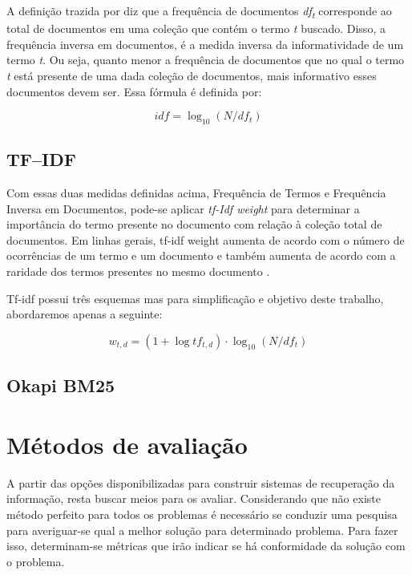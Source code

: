 A definição trazida por \cite{Manning2008} diz que a frequência de documentos \textit{df\textsubscript{t}} corresponde ao total de documentos em uma coleção que contém o termo \textit{t} buscado. Disso, a frequência inversa em documentos, é a medida inversa da informatividade de um termo \textit{t}. Ou seja, quanto menor a frequência de documentos que no qual o termo \textit{t} está presente de uma dada coleção de documentos, mais informativo esses documentos devem ser. Essa fórmula é definida por:

\begin{equation}
idf = \log_{10}(N/df_{t})
\label{eq:idf}
\end{equation}

\subsection{TF–IDF}

Com essas duas medidas definidas acima, Frequência de Termos e Frequência Inversa em Documentos, pode-se aplicar \textit{tf-Idf weight} para determinar a importância do termo presente no documento com relação à coleção total de documentos. Em linhas gerais, tf-idf weight aumenta de acordo com o número de ocorrências de um termo e um documento e também aumenta de acordo com a raridade dos termos presentes no mesmo documento \cite{Manning2008}. 

Tf-idf possui três esquemas mas para simplificação e objetivo deste trabalho, abordaremos apenas a seguinte:
 
\begin{equation}
w_{t,d} = (1 + \log tf_{t,d}) \cdot \log_{10}(N/df_{t})
\label{eq:tf-idf}
\end{equation}

\subsection{Okapi BM25}

\section{Métodos de avaliação}
A partir das opções disponibilizadas para construir sistemas de recuperação da informação, resta buscar meios para os avaliar. Considerando que não existe método perfeito para todos os problemas é necessário se conduzir uma pesquisa para averiguar-se qual a melhor solução para determinado problema. Para fazer isso, determinam-se métricas que irão indicar se há conformidade da solução com o problema.

